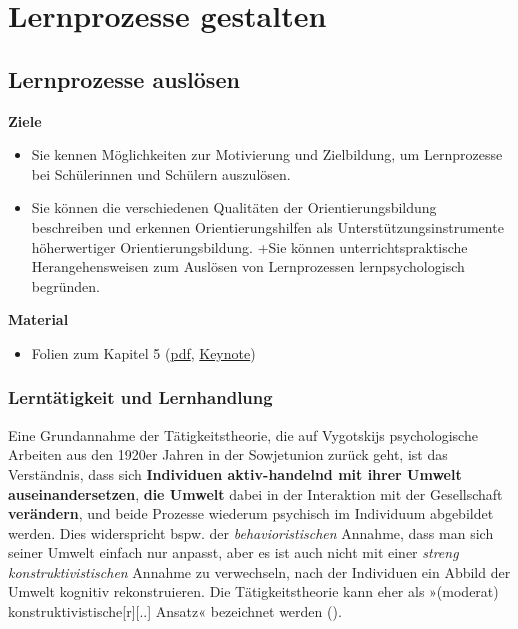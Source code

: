 \documentclass[
]{scrbook}
\providecommand{\tightlist}{%
  \setlength{\itemsep}{0pt}\setlength{\parskip}{0pt}}
\renewenvironment{quote}{
  \list{}{
	\leftmargin0.2cm   %
    \rightmargin\leftmargin
      	\def\FrameCommand
    {%
        {\color{quoteColor}\vrule width 2pt}%
        \hspace{0pt}%
    }%
    \MakeFramed{\advance \hsize -\width \FrameRestore}    \color{quoteColor}
    }
  \item\relax
}
{\endlist\color{black}\endMakeFramed}
\theoremstyle{definition}
\theoremstyle{definition}
\theoremstyle{definition}
\theoremstyle{definition}
\theoremstyle{remark}
\begin{document}
\part*{Lernprozesse gestalten}\label{part-lernprozesse-gestalten}

\chapter{Lernprozesse auslösen}\label{lernprozesse-ausluxf6sen}

\begin{quote}
\textbf{Ziele}

\begin{itemize}
\tightlist
\item
  Sie kennen Möglichkeiten zur Motivierung und Zielbildung, um Lernprozesse bei Schülerinnen und Schülern auszulösen.
\item
  Sie können die verschiedenen Qualitäten der Orientierungsbildung beschreiben und erkennen Orientierungshilfen als Unterstützungsinstrumente höherwertiger Orientierungsbildung.
  +Sie können unterrichtspraktische Herangehensweisen zum Auslösen von Lernprozessen lernpsychologisch begründen.
\end{itemize}

\textbf{Material}

\begin{itemize}
\tightlist
\item
  Folien zum Kapitel 5 (\href{files/Stoffdidaktik2024-05-LernprozesseAusloesen.pdf}{pdf}, \href{files/Stoffdidaktik2024-05-LernprozesseAusloesen.key}{Keynote})
\end{itemize}
\end{quote}

\section{Lerntätigkeit und Lernhandlung}\label{lerntaetigkeit-und-lernhandlung}

Eine Grundannahme der Tätigkeitstheorie, die auf Vygotskijs psychologische Arbeiten aus den 1920er Jahren in der Sowjetunion zurück geht, ist das Verständnis, dass sich \textbf{Individuen aktiv-handelnd mit ihrer Umwelt auseinandersetzen}, \textbf{die Umwelt} dabei in der Interaktion mit der Gesellschaft \textbf{verändern}, und beide Prozesse wiederum psychisch im Individuum abgebildet werden. Dies widerspricht bspw. der \emph{behavioristischen} Annahme, dass man sich seiner Umwelt einfach nur anpasst, aber es ist auch nicht mit einer \emph{streng konstruktivistischen} Annahme zu verwechseln, nach der Individuen ein Abbild der Umwelt kognitiv rekonstruieren. Die Tätigkeitstheorie kann eher als »(moderat) konstruktivistische{[}r{]}{[}..{]} Ansatz« bezeichnet werden ().
\end{document}
